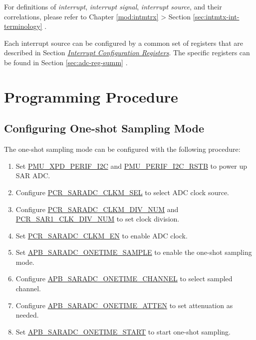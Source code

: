 \documentclass[main\_\_EN.tex]{subfiles}
\begin{document}
\begin{tiplisting}
For definitions of \textit{interrupt}, \textit{interrupt signal}, \textit{interrupt source}, and their correlations, please refer to Chapter \ref{mod:intmtrx} \textit{} > Section \ref{sec:intmtx-int-terminology} \textit{}.
\end{tiplisting}

Each interrupt source can be configured by a common set of registers that are described in Section \hyperref[interrupt-config-registers]{\textit{Interrupt Configuration Registers}}. The specific registers can be found in Section \ref{sec:adc-reg-summ} \textit{}.



\section{Programming Procedure}
\label{sec:adc_programming_procedure}

\subsection{Configuring One-shot Sampling Mode}

The one-shot sampling mode can be configured with the following procedure:

\begin{enumerate}
    \item Set \hyperref[fielddesc:PMUXPDPERIFI2C]{PMU\_XPD\_PERIF\_I2C} and \hyperref[fielddesc:PMUPERIFI2CRSTB]{PMU\_PERIF\_I2C\_RSTB} to power up SAR ADC.
    \item Configure \hyperref[fielddesc:PCRSARADCCLKMSEL]{PCR\_SARADC\_CLKM\_SEL} to select ADC clock source.
    \item Configure \hyperref[fielddesc:PCRSARADCCLKMDIVNUM]{PCR\_SARADC\_CLKM\_DIV\_NUM} and \hyperref[fielddesc:PCRSAR1CLKDIVNUM]{PCR\_SAR1\_CLK\_DIV\_NUM} to set clock division.
    \item Set \hyperref[fielddesc:PCRSARADCCLKMEN]{PCR\_SARADC\_CLKM\_EN} to enable ADC clock.
    \item Set \hyperref[fielddesc:APBSARADCONETIMESAMPLE]{APB\_SARADC\_ONETIME\_SAMPLE} to enable the one-shot sampling mode.
    \item Configure \hyperref[fielddesc:APBSARADCONETIMECHANNEL]{APB\_SARADC\_ONETIME\_CHANNEL} to select sampled channel.
    \item Configure \hyperref[fielddesc:APBSARADCONETIMEATTEN]{APB\_SARADC\_ONETIME\_ATTEN} to set attenuation as needed.
    \item Set \hyperref[fielddesc:APBSARADCONETIMESTART]{APB\_SARADC\_ONETIME\_START} to start one-shot sampling.
\end{enumerate}
\end{document}
